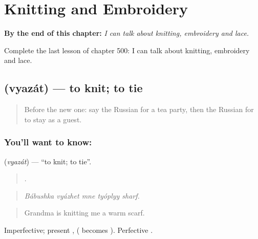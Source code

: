 
\chapter{Knitting and Embroidery}
\label{ch:ru-knitting-and-embroidery}

\begin{chapteropening}
\textbf{By the end of this chapter:} \emph{I can talk about knitting, embroidery and lace.}

Complete the last lesson of chapter 500: I can talk about knitting, embroidery and lace.
\end{chapteropening}

\section[\texorpdfstring{\ru{вязать} (vyazát)}{вязать (vyazát)}]{ (vyazát) — to knit; to tie}

\label{lesson:RU-C500-vyazat}



\begin{quote}
Before the new one: say the Russian for a tea party, then the Russian for to stay as a guest.
\end{quote}

\subsection*{You'll want to know: }
\textbf{} (\emph{vyazát}) — \textquotedblleft{}to knit; to tie\textquotedblright{}.

\begin{quote}
    .
\end{quote}

\begin{quote}
\emph{Bábushka vyázhet mne tyóplyy sharf.}
\end{quote}

\begin{quote}
Grandma is knitting me a warm scarf.
\end{quote}

Imperfective; present ,  ( becomes ). Perfective .

